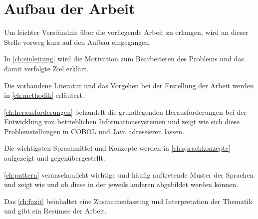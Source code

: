 \section{Aufbau der Arbeit}
Um leichter Verständnis über die vorliegende Arbeit zu erlangen, wird an dieser Stelle vorweg kurz auf den Aufbau eingegangen.

In \autoref{ch:einleitung} wird die Motivation zum Bearbeiteten des Problems und das damit verfolgte Ziel erklärt. 

Die vorhandene Literatur und das Vorgehen bei der Erstellung der Arbeit werden in \autoref{ch:methodik} erläutert.

\autoref{ch:herausforderungen} behandelt die grundlegenden Herausforderungen bei der Entwicklung von betrieblichen Informationssystemen und zeigt wie sich diese Problemstellungen in COBOL und Java adressieren lassen.    

Die wichtigsten Sprachmittel und Konzepte werden in \autoref{ch:sprachkonzepte} aufgezeigt und gegenübergestellt.

\autoref{ch:pattern} veranschaulicht wichtige und häufig auftretende Muster der Sprachen und zeigt wie und ob diese in der jeweils anderen abgebildet werden können.

Das \autoref{ch:fazit} beinhaltet eine Zusammenfassung und Interpretation der Thematik und gibt ein Re­sü­mee der Arbeit.